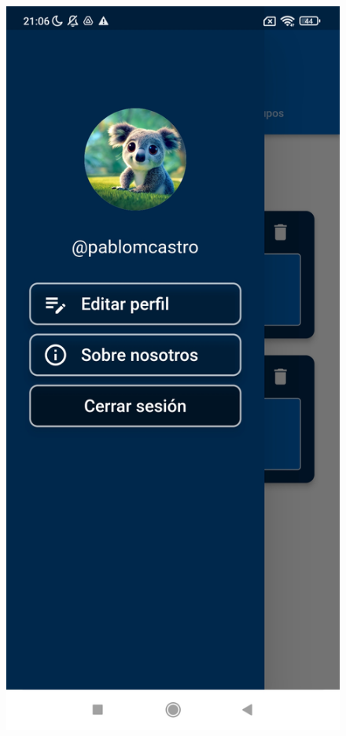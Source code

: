 \documentclass{article}
\begin{document}
\begin{figure}[htbp]
    \centering
    \begin{minipage}[h]{0.32\textwidth}
        \includegraphics[width=\textwidth]{imagenes/pantallas/sidenav.jpg}

\end{minipage}
\end{figure}
\end{document}
